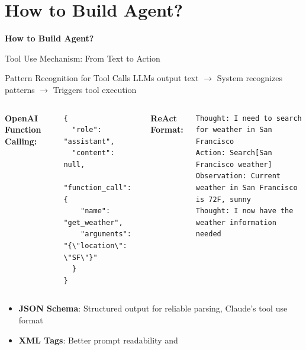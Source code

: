 \documentclass[aspectratio=169]{beamer}
\begin{document}
\section{How to Build Agent?}

\begin{frame}
	\begin{center}
		\Large
		\textbf{How to Build Agent?}

	\end{center}
\end{frame}

\begin{frame}[fragile]{Tool Use Mechanism: From Text to Action}
	\begin{block}{Pattern Recognition for Tool Calls}
		LLMs output text $\rightarrow$ System recognizes patterns $\rightarrow$ Triggers tool execution
	\end{block}
	
	\begin{columns}
		\textbf{OpenAI Function Calling:}
		\begin{lstlisting}[basicstyle=\tiny]
{
  "role": "assistant",
  "content": null,
  "function_call": {
    "name": "get_weather",
    "arguments": "{\"location\": \"SF\"}"
  }
}
		\end{lstlisting}
		
		\textbf{ReAct Format:}
		\begin{lstlisting}[basicstyle=\tiny]
Thought: I need to search for weather in San Francisco
Action: Search[San Francisco weather]
Observation: Current weather in San Francisco is 72F, sunny
Thought: I now have the weather information needed
		\end{lstlisting}
	\end{columns}
	
	\vspace{0.3cm}
	\begin{itemize}
		\item {\color{highlight}\textbf{JSON Schema}}: Structured output for reliable parsing,
		Claude's tool use format
		\item {\color{highlight}\textbf{XML Tags}}: Better prompt readability and 
	\end{itemize}
\end{frame}
\end{document}
